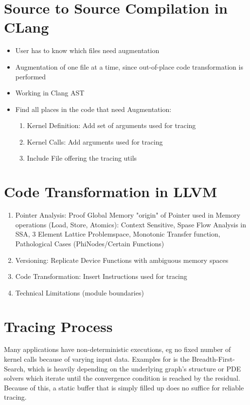 \section{Source to Source Compilation in CLang}\label{sec:impl:clang}
\begin{itemize}
	\item User has to know which files need augmentation
	\item Augmentation of one file at a time, since out-of-place code transformation is performed
	\item Working in Clang AST
	\item Find all places in the code that need Augmentation:
	\begin{enumerate}
		\item Kernel Definition: Add set of arguments used for tracing
		\item Kernel Calls: Add arguments used for tracing
		\item Include File offering the tracing utils
	\end{enumerate}
\end{itemize}
\section{Code Transformation in LLVM}
\begin{enumerate}
	\item Pointer Analysis: Proof Global Memory "origin" of Pointer used in Memory operations (Load, Store, Atomics): Context Sensitive, Spase Flow Analysis in SSA, 3 Element Lattice Problemspace, Monotonic Transfer function, Pathological Cases (PhiNodes/Certain Functions)
	\item Versioning: Replicate Device Functions with ambiguous memory spaces
	\item Code Transformation: Insert Instructions used for tracing
	\item Technical Limitations (module boundaries) 
\end{enumerate}

\section{Tracing Process}
	Many applications have non-deterministic executions, eg no fixed number of kernel calls because of varying input data. Examples for is the Breadth-First-Search, which is heavily depending on the underlying graph's structure or PDE solvers which iterate until the
	convergence condition is reached by the residual. Because of this, a static buffer that is simply filled up does no suffice for reliable tracing.
	
